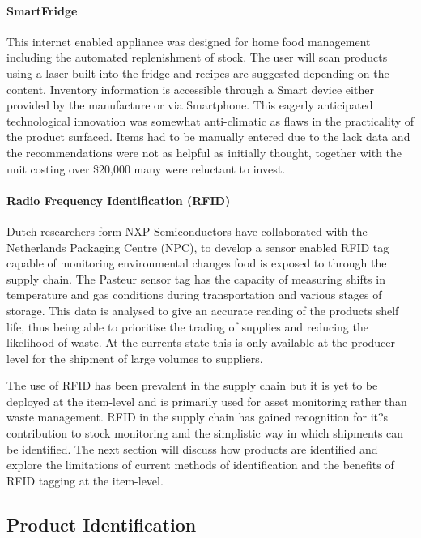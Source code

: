 \documentclass[a4paper, 11pt]{article}
\begin{document}
\paragraph{SmartFridge}
This internet enabled appliance was designed for home food management including the automated replenishment of stock. The user will scan products using a laser built into the fridge and recipes are suggested depending on the content. Inventory information is accessible through a Smart device either provided by the manufacture or via Smartphone. This eagerly anticipated technological innovation was somewhat anti-climatic as flaws in the practicality of the product surfaced. Items had to be manually entered due to the lack data and the recommendations were not as helpful as initially thought, together with the unit costing over \$20,000 many were reluctant to invest.

\paragraph{Radio Frequency Identification (RFID)}
Dutch researchers form NXP Semiconductors have collaborated with the Netherlands Packaging Centre (NPC),  to develop a sensor enabled RFID tag capable of monitoring environmental changes food is exposed to through the supply chain. The Pasteur sensor tag has the capacity of measuring shifts in temperature and gas conditions during transportation and various stages of storage. This data is analysed to give an accurate reading of the products shelf life, thus being able to prioritise the trading of supplies and reducing the likelihood of waste. At the currents state this is only available at the producer-level for the shipment of large volumes to suppliers. 

The use of RFID has been prevalent in the supply chain but it is yet to be deployed at the item-level and is primarily used for asset monitoring rather than waste management. RFID in the supply chain has gained recognition for it?s contribution to stock monitoring and the simplistic way in which shipments can be identified. The next section will discuss how products are identified and explore the limitations of current methods of identification and the benefits of RFID tagging at the item-level. 

\vspace{\baselineskip}
\vspace{\baselineskip}
\vspace{\baselineskip}

\subsection{Product Identification}
\end{document}
